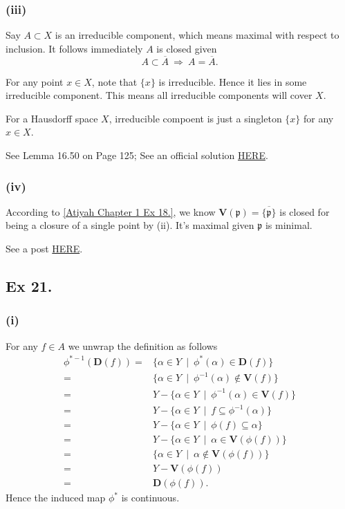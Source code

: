 \subsubsection{(iii)}

Say $A\subset X$ is an irreducible component, which means maximal with respect to inclusion. It follows immediately $A$ is closed given $$A\subset \overline{A} ~\Rightarrow~ A=\overline{A}.$$

For any point $x\in X$, note that $\{x\}$ is irreducible. Hence it lies in some irreducible component. This means all irreducible components will cover $X$.

For a Hausdorff space $X$, irreducible compoent is just a singleton $\{x\}$ for any $x\in X$.

See \cite{altman} Lemma 16.50 on Page 125; See an official solution \href{https://metaphor.ethz.ch/x/2019/hs/401-3660-69L/ex/SolSheet1.pdf}{HERE}.

\subsubsection{(iv)}

According to \ref{Atiyah Chapter 1 Ex 18.}, we know $\mathbf V(\mathfrak p)=\overline{\{\mathfrak p\}}$ is closed for being a closure of a single point by (ii). It's maximal given $\mathfrak p$ is minimal.

See a post \href{https://math.stackexchange.com/questions/764677/irreducible-components-of-speca}{HERE}.

\subsection{Ex 21.}\label{Atiyah Chapter 1 Ex 21.}

\subsubsection{(i)}

For any $f\in A$ we unwrap the definition as follows \begin{align*}
    \phi^{\ast -1}(\mathbf D(f)) =& \{\alpha\in Y ~\mid~ \phi^{\ast}(\alpha)\in \mathbf D(f)\}\\
    =& \{\alpha \in Y ~\mid~ \phi^{-1}(\alpha)\notin \mathbf V(f)\} \\
    =& Y-\{\alpha\in Y~\mid~ \phi^{-1}(\alpha)\in \mathbf V(f)\}\\
    =& Y-\{\alpha\in Y~\mid~ f\subseteq\phi^{-1}(\alpha)\}\\
    =& Y-\{\alpha\in Y~\mid~ \phi(f)\subseteq \alpha\}\\
    =& Y-\{\alpha\in Y~\mid~ \alpha\in \mathbf V(\phi(f))\}\\
    =& \{\alpha\in Y ~\mid~ \alpha\notin \mathbf V(\phi(f))\}\\
    =& Y-\mathbf V(\phi(f))\\
    =& \mathbf D(\phi(f)).
\end{align*}
Hence the induced map $\phi^{\ast}$ is continuous.

